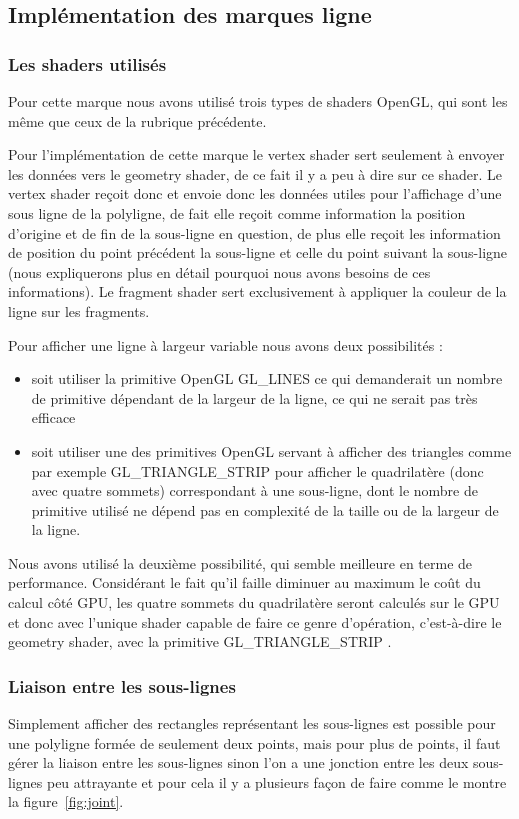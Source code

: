 \documentclass[12pt]{article}
\begin{document}
\subsection{Implémentation des marques ligne}
\subsubsection{Les shaders utilisés}
Pour cette marque nous avons utilisé trois types de shaders OpenGL, qui sont les même que ceux de la rubrique précédente.

Pour l’implémentation de cette marque le vertex shader sert seulement à envoyer
 les données vers le geometry shader, de ce fait il y a peu à dire sur ce shader.
 Le vertex shader reçoit donc et envoie donc les données utiles pour l’affichage
 d’une sous ligne de la polyligne, de fait elle reçoit comme information la position
 d’origine et de fin de la sous-ligne en question, de plus elle reçoit les information
 de position du point précédent la sous-ligne et celle du point suivant la sous-ligne
 (nous expliquerons plus en détail pourquoi nous avons besoins de ces informations).
 Le fragment shader sert exclusivement à appliquer la couleur de la ligne sur les fragments.

Pour afficher une ligne à largeur variable nous avons deux possibilités :
\begin{itemize}
\item soit utiliser la primitive OpenGL \og GL\_LINES \fg{} ce qui demanderait un nombre de primitive dépendant de la largeur de la ligne, ce qui ne serait pas très efficace
\item soit utiliser une des primitives OpenGL servant à afficher des triangles comme par exemple \og GL\_TRIANGLE\_STRIP \fg{} pour afficher le quadrilatère (donc avec quatre sommets) correspondant à une sous-ligne, dont le nombre de primitive utilisé ne dépend pas en complexité de la taille ou de la largeur de la ligne.
\end{itemize}

Nous avons utilisé la deuxième possibilité, qui semble meilleure en terme de performance.
Considérant le fait qu’il faille diminuer au maximum le coût du calcul côté GPU, les quatre sommets du quadrilatère seront calculés sur le GPU et donc avec l’unique shader capable de faire ce genre d’opératio­n, c’est-à-dire le geometry shader, avec la primitive \og GL\_TRIANGLE\_STRIP \fg{}.

\subsubsection{Liaison entre les sous-lignes}
Simplement afficher des rectangles représentant les sous-lignes est possible pour une polyligne formée de seulement deux points, mais pour plus de points, il faut gérer la liaison entre les sous-lignes sinon l'on a une jonction entre les deux sous-lignes peu attrayante et pour cela il y a plusieurs façon de faire comme le montre la figure~\ref{fig:joint}.
\end{document}
